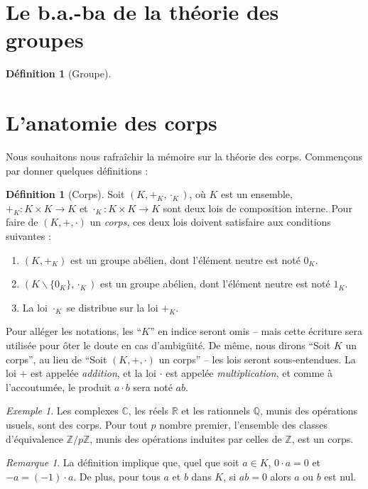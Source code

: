 \documentclass[a4paper, titlepage]{article}
\theoremstyle{definition}
\newtheorem{defi}[theo]{Définition}
\theoremstyle{remark}
\newtheorem{rema}[theo]{Remarque}
\newtheorem{exem}[theo]{Exemple}
\def\Z{\mathbb Z}
\def\Q{\mathbb Q}
\def\R{\mathbb R}
\def\C{\mathbb C}
\begin{document}
\newpage
\appendix

\section{Le b.a.-ba de la théorie des groupes}
\begin{defi}[Groupe]

\end{defi}

\section{L'anatomie des corps}

Nous souhaitons nous rafraîchir la mémoire sur la théorie des corps. Commençons par donner quelques définitions :

\begin{defi}[Corps]
Soit $(K,+_K,\cdot_K)$, où $K$ est un ensemble, $+_K : K \times K \rightarrow K$ et $\cdot_K: K \times K \rightarrow K$ sont deux lois de composition interne. Pour faire de $(K,+,\cdot)$ un \textit{corps}, ces deux lois doivent satisfaire aux conditions suivantes : \begin{enumerate}
\item $(K,+_K)$ est un groupe abélien, dont l'élément neutre est noté $0_K$.
\item $(K\backslash \{0_K\},\cdot_K)$ est un groupe abélien, dont l'élément neutre est noté $1_K$.
\item La loi $\cdot_K$ se distribue sur la loi $+_K$.
\end{enumerate}
\end{defi}

Pour alléger les notations, les ``$K$'' en indice seront omis -- mais cette écriture sera utilisée pour ôter le doute en cas d’ambigüité. De même, nous dirons ``Soit $K$ un corps'', au lieu de ``Soit $(K,+,\cdot)$ un corps'' -- les lois seront sous-entendues. La loi $+$ est appelée \textit{addition}, et la loi $\cdot$ est appelée \textit{multiplication}, et comme à l'accoutumée, le produit $a\cdot b$ sera noté $ab$.

\begin{exem}
Les complexes $\C$, les réels $\R$ et les rationnels $\Q$, munis des opérations usuels, sont des corps. Pour tout $p$ nombre premier, l'ensemble des classes d'équivalence $\Z/p\Z$, munis des opérations induites par celles de $\Z$, est un corps.
\end{exem}

\begin{rema}
La définition implique que, quel que soit $a \in K$, $0\cdot a = 0$ et $-a = (-1)\cdot a$. De plus, pour tous $a$ et $b$ dans $K$, si $ab = 0$ alors $a$ ou $b$ est nul.
\end{rema}
\end{document}
